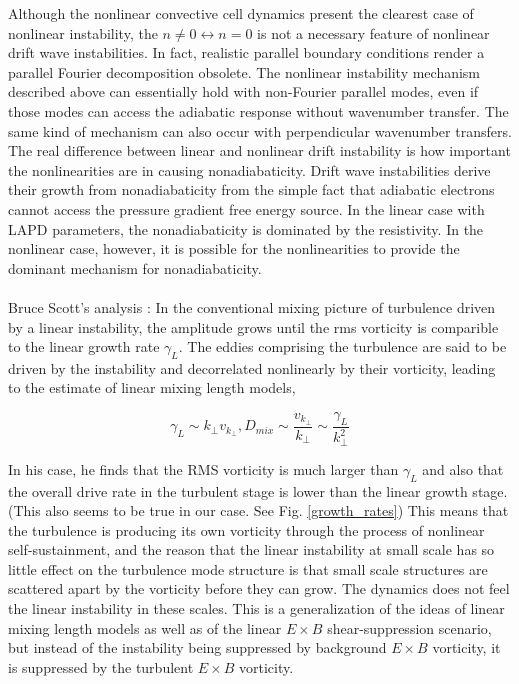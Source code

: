 \documentclass[12pt]{article}
\def\beq{\begin{equation}}
\def\eeq{\end{equation}}
\begin{document}
Although the nonlinear convective cell dynamics present the clearest case of nonlinear instability, the $n \ne 0 \leftrightarrow n=0$ is not a necessary feature of nonlinear drift wave
instabilities. In fact, realistic parallel boundary conditions render a parallel Fourier decomposition obsolete. The nonlinear instability mechanism described above can essentially
hold with non-Fourier parallel modes, even if those modes can access the adiabatic response without wavenumber transfer. The same kind of mechanism can also occur with perpendicular
wavenumber transfers. The real difference between linear and nonlinear drift instability is how important the nonlinearities are in causing nonadiabaticity.
Drift wave instabilities derive their growth from nonadiabaticity from the simple fact that adiabatic electrons cannot access the pressure gradient free energy source.
In the linear case with LAPD parameters, the nonadiabaticity is dominated by the resistivity. In the
nonlinear case, however, it is possible for the nonlinearities to provide the dominant mechanism for nonadiabaticity. \\ \\

Bruce Scott's analysis \cite{scott2005}: In the conventional mixing picture of turbulence driven by a linear instability, the amplitude grows until the rms vorticity is comparible to
the linear growth rate $\gamma_L$. The eddies comprising the turbulence are said to be driven by the instability and decorrelated nonlinearly by their vorticity, leading to the estimate
of linear mixing length models,

\beq
\gamma_L \sim k_\perp v_{k_\perp}, D_{mix} \sim \frac{v_{k_\perp}}{k_\perp} \sim \frac{\gamma_L}{k_\perp^2}
\eeq

In his case, he finds that the RMS vorticity is much larger than $\gamma_L$ and also that the overall drive rate in the turbulent stage is lower than the linear growth stage.
(This also seems to be true in our case. See Fig. \ref{growth_rates}) This means that the turbulence is producing its own vorticity through the process of nonlinear self-sustainment, and the reason that 
the linear instability at small scale has so little effect on the turbulence mode structure is that small scale structures are scattered apart by the vorticity before they can grow.
The dynamics does not feel the linear instability in these scales. This is a generalization of the ideas of linear mixing length models as well as of the linear $E \times B$
shear-suppression scenario, but instead of the instability being suppressed by background $E \times B$ vorticity, it is suppressed by the turbulent $E \times B$ vorticity. \\
\end{document}

